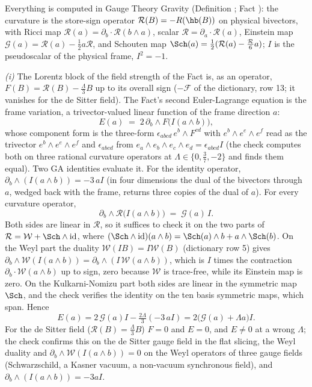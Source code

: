 Everything is computed in Gauge Theory Gravity (Definition ; Fact ): the curvature is the store-sign operator $\mathcal{R}(B) = -R(\hb(B))$ on physical bivectors, with Ricci map $\mathcal{R}(a) = \partial_{b}\cdot\mathcal{R}(b\wedge a)$, scalar $\mathcal{R} = \partial_{a}\cdot\mathcal{R}(a)$, Einstein map $\mathcal{G}(a) = \mathcal{R}(a) - \tfrac12 a\mathcal{R}$, and Schouten map $\Sch(a) = \tfrac12(\mathcal{R}(a) - \tfrac{\mathcal{R}}{6}a)$; $I$ is the pseudoscalar of the physical frame, $I^{2} = -1$.

\emph{(i)} The Lorentz block of the field strength of the Fact is, as an operator, $F(B) = \mathcal{R}(B) - \tfrac{\Lambda}{3}B$ up to its overall sign ($-\mathcal{F}$ of the dictionary, row 13; it vanishes for the de Sitter field). The Fact's second Euler-Lagrange equation is the frame variation, a trivector-valued linear function of the frame direction $a$:
\[
E(a) \;=\; 2\,\partial_{b}\wedge F\bigl(I(a\wedge b)\bigr),
\]
whose component form is the three-form $\epsilon_{abcd}\,e^{b}\wedge F^{cd}$ with $e^{b}\wedge e^{e}\wedge e^{f}$ read as the trivector $e^{b}\wedge e^{e}\wedge e^{f}$ and $\epsilon_{abcd}$ from $e_{a}\wedge e_{b}\wedge e_{c}\wedge e_{d} = \epsilon_{abcd}I$ (the check computes both on three rational curvature operators at $\Lambda \in \{0, \tfrac37, -2\}$ and finds them equal). Two GA identities evaluate it. For the identity operator, $\partial_{b}\wedge(I(a\wedge b)) = -3\,aI$ (in four dimensions the dual of the bivectors through $a$, wedged back with the frame, returns three copies of the dual of $a$). For every curvature operator,
\[
\partial_{b}\wedge\mathcal{R}\bigl(I(a\wedge b)\bigr) \;=\; \mathcal{G}(a)\,I .
\]
Both sides are linear in $\mathcal{R}$, so it suffices to check it on the two parts of $\mathcal{R} = \mathcal{W} + \Sch\wedge\mathrm{id}$, where $(\Sch\wedge\mathrm{id})(a\wedge b) = \Sch(a)\wedge b + a\wedge\Sch(b)$. On the Weyl part the duality $\mathcal{W}(IB) = I\mathcal{W}(B)$ (dictionary row 5) gives $\partial_{b}\wedge\mathcal{W}(I(a\wedge b)) = \partial_{b}\wedge(I\,\mathcal{W}(a\wedge b))$, which is $I$ times the contraction $\partial_{b}\cdot\mathcal{W}(a\wedge b)$ up to sign, zero because $\mathcal{W}$ is trace-free, while its Einstein map is zero. On the Kulkarni-Nomizu part both sides are linear in the symmetric map $\Sch$, and the check verifies the identity on the ten basis symmetric maps, which span. Hence
\[
E(a) = 2\,\mathcal{G}(a)I - \tfrac{2\Lambda}{3}(-3\,aI) = 2\bigl(\mathcal{G}(a) + \Lambda a\bigr)I .
\]
For the de Sitter field ($\mathcal{R}(B) = \tfrac{\Lambda}{3}B$) $F = 0$ and $E = 0$, and $E \neq 0$ at a wrong $\Lambda$; the check confirms this on the de Sitter gauge field in the flat slicing, the Weyl duality and $\partial_{b}\wedge\mathcal{W}(I(a\wedge b)) = 0$ on the Weyl operators of three gauge fields (Schwarzschild, a Kasner vacuum, a non-vacuum synchronous field), and $\partial_{b}\wedge(I(a\wedge b)) = -3aI$.

